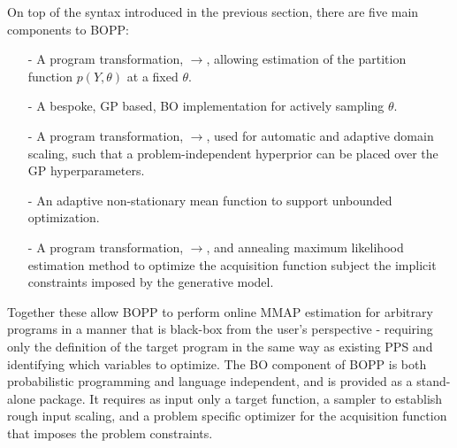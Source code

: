 
On top of the syntax introduced in the previous section, there are five main components to BOPP:
\begin{itemize}
	\setlength\itemsep{-0.1em}
	\item[-] A program transformation, $\rightarrow$\qmarg, allowing estimation of the partition function $p(Y,\theta)$ at a fixed $\theta$.
	\item[-] A bespoke, GP based, BO implementation for actively sampling $\theta$.
	\item[-] A program transformation, $\rightarrow$\qprior,  used for automatic and adaptive domain scaling, such that a problem-independent hyperprior can be placed over the GP hyperparameters.
	\item[-] An adaptive non-stationary mean function to support unbounded optimization.
	\item[-] A program transformation, $\rightarrow$\qacq, and annealing maximum likelihood estimation method to optimize the acquisition function subject the implicit constraints imposed by the generative model.
\end{itemize}
Together these allow BOPP to perform online MMAP estimation for arbitrary programs in a manner that is black-box from the user's perspective - requiring only the definition of the target program in the same way as existing PPS and identifying which variables to optimize.  The BO component of BOPP is both probabilistic programming and language independent, and is provided as a stand-alone package.  It requires as input only a target function, a sampler to establish rough input scaling, and a problem specific optimizer for the acquisition function that imposes the problem constraints.  %


